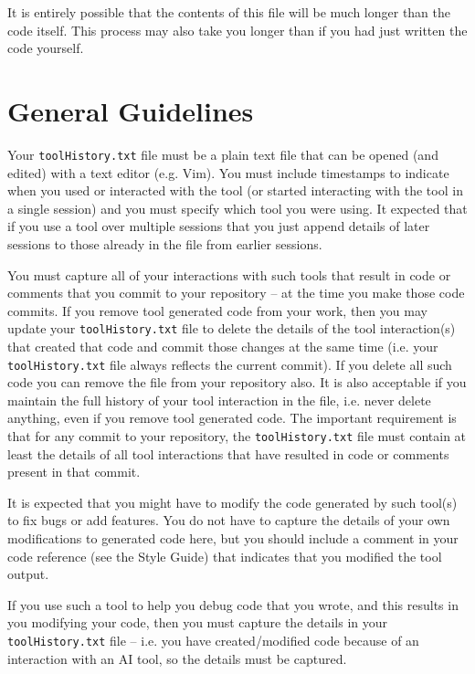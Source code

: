 \documentclass{article}
\begin{document}
It is entirely possible that the contents of this file will be much longer than the code itself. This process may also take you longer
than if you had just written the code yourself.

\section {General Guidelines}
Your \texttt{toolHistory.txt} file must be a plain text file that can be opened (and edited) with a text editor (e.g. Vim). You must include
timestamps to indicate when you used or interacted with the tool (or started interacting with the tool in a single session) and you must
specify which tool you were using. It expected that if you use a tool over multiple sessions that you just append details of later sessions
to those already in the file from earlier sessions.

You must capture all of your interactions with such tools that result in code or comments that you commit to your repository --
at the time you make those code commits. If you 
remove tool generated code from your work, then you may update your \texttt{toolHistory.txt} file to delete the details of the
tool interaction(s) that created that code and commit those changes at the same time (i.e. your \texttt{toolHistory.txt} file
always reflects the current commit). If you delete all such code you can remove the file from your repository also.
It is also acceptable if you maintain the full history of your tool interaction in the file, i.e. never delete anything, even if you 
remove tool generated code. The important requirement is that for any commit to your repository, the \texttt{toolHistory.txt} file
must contain at least the details of all tool interactions that have resulted in code or comments present in that commit.

It is expected that you might have to modify the code generated by such tool(s) to fix bugs or add features. 
You do not have to capture the details
of your own modifications to generated code here, but you should include a comment in your code reference (see the Style Guide)
that indicates that you modified the tool output. 

If you use such a tool to help you debug code that you wrote, and this results in you modifying your code, then 
you must capture the details in your \texttt{toolHistory.txt} file -- i.e. you have created/modified code because of an 
interaction with an AI tool, so the details must be captured.
\end{document}
